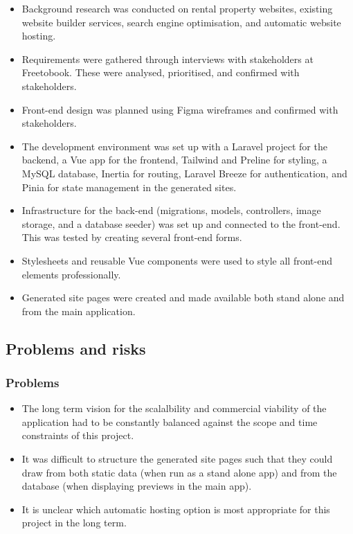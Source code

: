 \documentclass[11pt]{article}
\begin{document}
\begin{itemize}

\item Background research was conducted on rental property websites, existing website builder services, search engine optimisation, and automatic website hosting.
\item Requirements were gathered through interviews with stakeholders at Freetobook. These were analysed, prioritised, and confirmed with stakeholders.
\item Front-end design was planned using Figma wireframes and confirmed with stakeholders.
\item The development environment was set up with a Laravel project for the backend, a Vue app for the frontend, Tailwind and Preline for styling, a MySQL database, Inertia for routing, Laravel Breeze for authentication, and Pinia for state management in the generated sites.
\item Infrastructure for the back-end (migrations, models, controllers, image storage, and a database seeder) was set up and connected to the front-end. This was tested by creating several front-end forms.
\item Stylesheets and reusable Vue components were used to style all front-end elements professionally.
\item Generated site pages were created and made available both stand alone and from the main application.

\end{itemize}



\subsection{Problems and risks}\label{problems-and-risks}


\subsubsection{Problems}\label{problems}

\begin{itemize}

\item The long term vision for the scalalbility and commercial viability of the application had to be constantly balanced against the scope and time constraints of this project.
\item It was difficult to structure the generated site pages such that they could draw from both static data (when run as a stand alone app) and from the database (when displaying previews in the main app).
\item It is unclear which automatic hosting option is most appropriate for this project in the long term.

\end{itemize}
\end{document}
